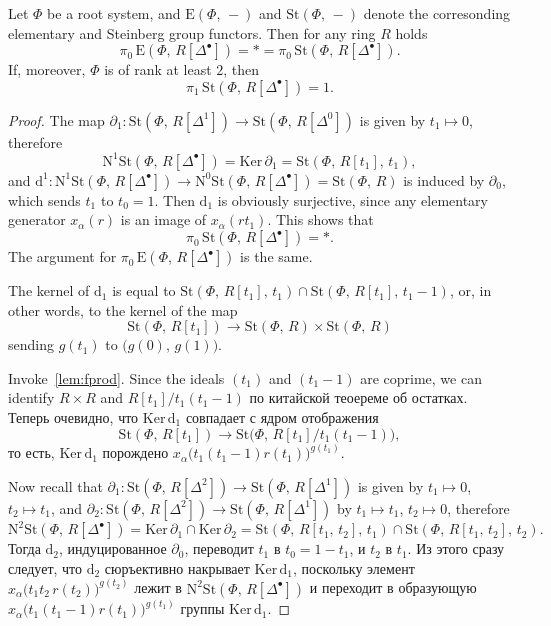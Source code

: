 \documentclass[oneside, 11pt]{amsart}
\begin{document}
\begin{lemma}
Let $\Phi$ be a root system, and $\mathrm E(\Phi,\,-)$ and $\mathrm{St}(\Phi,\,-)$ denote the corresonding elementary and Steinberg group functors. Then for any ring $R$ holds $$\pi_0\,\mathrm E(\Phi,\,R[\Delta^\bullet])=*=\pi_0\,\mathrm{St}(\Phi,\,R[\Delta^\bullet]).$$ If, moreover, $\Phi$ is of rank at least $2$, then $$\pi_1\,\mathrm{St}(\Phi,\,R[\Delta^\bullet])=1.$$
\end{lemma}
\begin{proof}
The map $\partial_1\colon\mathrm{St}(\Phi,\,R[\Delta^1])\rightarrow\mathrm{St}(\Phi,\,R[\Delta^0])$ is given by $t_1\mapsto0$, therefore 
$$\mathrm N^1\mathrm{St}(\Phi,\,R[\Delta^\bullet])=\mathrm{Ker}\,\partial_1=\mathrm{St}(\Phi,\,R[t_1],\,t_1),$$
and $\mathrm d^1\colon\mathrm N^1\mathrm{St}(\Phi,\,R[\Delta^\bullet])\rightarrow\mathrm N^0\mathrm{St}(\Phi,\,R[\Delta^\bullet])=\mathrm{St}(\Phi,\,R)$ is induced by $\partial_0$, which sends $t_1$ to $t_0=1$. %
Then $\mathrm d_1$ is obviously surjective, since any elementary generator $x_\alpha(r)$ is an image of $x_\alpha(rt_1)$. This shows that $$\pi_0\,\mathrm{St}(\Phi,\,R[\Delta^\bullet])=*.$$ The argument for $\pi_0\,\mathrm E(\Phi,\,R[\Delta^\bullet])$ is the same.

The kernel of $\mathrm d_1$ is equal to $\mathrm{St}(\Phi,\,R[t_1],\,t_1)\cap\mathrm{St}(\Phi,\,R[t_1],\,t_1-1)$, or, in other words, to the kernel of the map
$$
\mathrm{St}(\Phi,\,R[t_1])\rightarrow\mathrm{St}(\Phi,\,R)\times\mathrm{St}(\Phi,\,R)
$$
sending $g(t_1)$ to $\big(g(0),\,g(1)\big)$. 

Invoke~\cref{lem:fprod}.
Since the ideals $(t_1)$ and $(t_1-1)$ are coprime, we can identify $R\times R$ and $R[t_1]/t_1(t_1-1)$ по китайской теоереме об остатках. Теперь очевидно, что $\mathrm{Ker}\,\mathrm d_1$ совпадает с ядром отображения
$$
\mathrm{St}(\Phi,\,R[t_1])\rightarrow\mathrm{St}\big(\Phi,\,R[t_1]/t_1(t_1-1)\big),
$$
то есть, $\mathrm{Ker}\,\mathrm d_1$ порождено $x_{\alpha}\big(t_1(t_1-1)r(t_1)\big)^{g(t_1)}$.

Now recall that $\partial_1\colon\mathrm{St}(\Phi,\,R[\Delta^2])\rightarrow\mathrm{St}(\Phi,\,R[\Delta^1])$ is given by $t_1\mapsto0$, $t_2\mapsto t_1$, and $\partial_2\colon\mathrm{St}(\Phi,\,R[\Delta^2])\rightarrow\mathrm{St}(\Phi,\,R[\Delta^1])$ by $t_1\mapsto t_1$, $t_2\mapsto0$, therefore
$$
\mathrm N^2\mathrm{St}(\Phi,\,R[\Delta^\bullet])=\mathrm{Ker}\,\partial_1\cap\mathrm{Ker}\,\partial_2=\mathrm{St}(\Phi,\,R[t_1,\,t_2],\,t_1)\cap\mathrm{St}(\Phi,\,R[t_1,\,t_2],\,t_2).
$$
Тогда $\mathrm d_2$, индуцированное $\partial_0$, переводит $t_1$ в $t_0=1-t_1$, и $t_2$ в $t_1$. Из этого сразу следует, что $\mathrm d_2$ сюръективно накрывает $\mathrm{Ker}\,\mathrm d_1$, поскольку элемент $x_{\alpha}\big(t_1t_2\,r(t_2)\big)^{g(t_2)}$ лежит в $\mathrm N^2\mathrm{St}(\Phi,\,R[\Delta^\bullet])$ и переходит в образующую $x_{\alpha}\big(t_1(t_1-1)r(t_1)\big)^{g(t_1)}$ группы $\mathrm{Ker}\,\mathrm d_1$.
\end{proof}

\printbibliography
\end{document}
